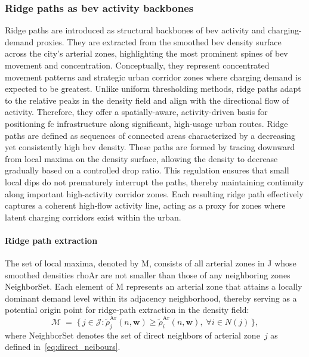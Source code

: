 
\subsubsection{Ridge paths as \gls{bev} activity backbones}\label{sec:Ridge paths}
Ridge paths are introduced as structural backbones of \gls{bev} activity and charging-demand proxies.
They are extracted from the smoothed \gls{bev} density surface across the city's arterial zones, highlighting the most prominent spines of \gls{bev} movement and concentration.
 Conceptually, they represent concentrated movement patterns and strategic urban corridor zones where charging demand is expected to be greatest. Unlike uniform thresholding methods, ridge paths adapt to the relative peaks in the density field and align with the directional flow of activity. Therefore, they offer a spatially-aware, activity-driven basis for positioning \gls{fc} infrastructure along significant, high-usage urban routes. Ridge paths are defined as sequences of connected areas characterized by a decreasing yet consistently high \gls{bev} density. These paths are formed by tracing downward from local maxima on the density surface, allowing the density to decrease gradually based on a controlled drop ratio. This regulation ensures that small local dips do not prematurely interrupt the paths, thereby maintaining continuity along important high-activity corridor zones. Each resulting ridge path effectively captures a coherent high-flow activity line, acting as a proxy for zones where latent charging corridors exist within the urban.

\paragraph{Ridge path extraction}
The set of local maxima, denoted by \gls{M}, consists of all arterial zones in \gls{J} whose smoothed densities \gls{rhoAr} are not smaller than those of any neighboring zones \gls{NeighborSet}. Each element of \gls{M} represents an arterial zone that attains a locally dominant demand level within its adjacency neighborhood, thereby serving as a potential origin point for ridge-path extraction in the density field:
\begin{equation}
  \label{eq:local_maxima_set}
  \mathcal{M}
   \;=\;
   \bigl\{\, 
      j \in \mathcal{J} 
      : \tilde{\rho}^{\mathrm{Ar}}_{j}(n,\mathbf{w}) 
        \ge \tilde{\rho}^{\mathrm{Ar}}_{i}(n,\mathbf{w}),\;
        \forall i \in N(j)
   \,\bigr\},
\end{equation}
where \gls{NeighborSet} denotes the set of direct neighbors of arterial zone~$j$ as defined in~\eqref{eq:direct_neibours}.


